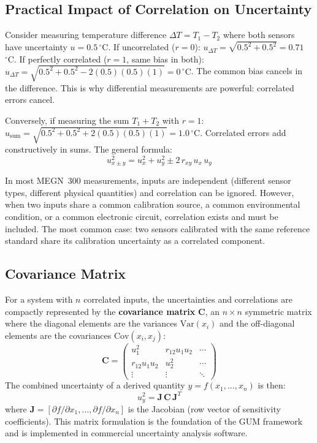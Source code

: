 \documentclass[11pt,letterpaper,twoside,openany]{book}
\newcommand{\degC}{\ensuremath{{}^{\circ}\text{C}}}
\begin{document}
\subsection{Practical Impact of Correlation on Uncertainty}
Consider measuring temperature difference $\Delta T = T_1 - T_2$ where both sensors have uncertainty $u = 0.5$\,\degC{}. If uncorrelated ($r = 0$): $u_{\Delta T} = \sqrt{0.5^2 + 0.5^2} = 0.71$\,\degC{}. If perfectly correlated ($r = 1$, same bias in both): $u_{\Delta T} = \sqrt{0.5^2 + 0.5^2 - 2(0.5)(0.5)(1)} = 0$\,\degC{}. The common bias cancels in the difference. This is why differential measurements are powerful: correlated errors cancel.

Conversely, if measuring the sum $T_1 + T_2$ with $r = 1$: $u_{\text{sum}} = \sqrt{0.5^2 + 0.5^2 + 2(0.5)(0.5)(1)} = 1.0$\,\degC{}. Correlated errors add constructively in sums. The general formula:
\begin{equation}
u_{x \pm y}^2 = u_x^2 + u_y^2 \pm 2\,r_{xy}\,u_x\,u_y
\end{equation}

\begin{warningbox}
In most MEGN~300 measurements, inputs are independent (different sensor types, different physical quantities) and correlation can be ignored. However, when two inputs share a common calibration source, a common environmental condition, or a common electronic circuit, correlation exists and must be included. The most common case: two sensors calibrated with the same reference standard share its calibration uncertainty as a correlated component.
\end{warningbox}

\subsection{Covariance Matrix}
For a system with $n$ correlated inputs, the uncertainties and correlations are compactly represented by the \textbf{covariance matrix} $\mathbf{C}$, an $n \times n$ symmetric matrix where the diagonal elements are the variances $\text{Var}(x_i)$ and the off-diagonal elements are the covariances $\text{Cov}(x_i, x_j)$:
\begin{equation}
\mathbf{C} = \begin{pmatrix} u_1^2 & r_{12}u_1 u_2 & \cdots \\ r_{12}u_1 u_2 & u_2^2 & \cdots \\ \vdots & \vdots & \ddots \end{pmatrix}
\end{equation}
The combined uncertainty of a derived quantity $y = f(x_1, \ldots, x_n)$ is then:
\begin{equation}
u_y^2 = \mathbf{J} \, \mathbf{C} \, \mathbf{J}^T
\end{equation}
where $\mathbf{J} = [\partial f/\partial x_1, \ldots, \partial f/\partial x_n]$ is the Jacobian (row vector of sensitivity coefficients). This matrix formulation is the foundation of the GUM framework and is implemented in commercial uncertainty analysis software.
\end{document}
